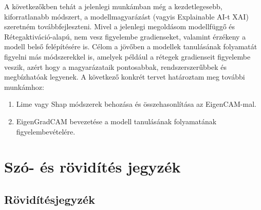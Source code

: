 \documentclass[12pt,oneside,a4paper]{article}
\newcommand{\newsection}[1]{\clearpage\section{#1}}\label{makro}
\theoremstyle{remark}
\begin{document}
	A következőkben tehát a jelenlegi munkámban még a kezdetlegesebb, kiforratlanabb módszert, a modellmagyarázást
	(vagyis Explainable AI-t
	\ac{XAI}) szeretném továbbfejleszteni.
	Mivel a jelenlegi megoldásom modellfüggő és Rétegaktiváció-alapú, nem vesz figyelembe gradienseket,
	valamint érzékeny a modell belső felépítésére is.
	Célom a jövőben a modellek tanulásának folyamatát figyelni más módszerekkel is, amelyek például a rétegek gradienseit
	figyelembe veszik, azért hogy a magyarázataik pontosabbak, rendszerszerűbbek és megbízhatóak legyenek.
	A következő konkrét tervet határoztam meg további munkámhoz:
	\begin{enumerate}
		\item Lime vagy Shap módszerek behozása és összehasonlítása az EigenCAM-mal.
		\cite{ribeiro-etal-2016-trust,lundberg2017unified}
		\item EigenGradCAM bevezetése a modell tanulásának folyamatának figyelembevételére.
	\end{enumerate}
	
	
	\printindex\label{ossz:indexjegyzek}
	
	\newsection{Szó- és rövidítés jegyzék}\label{sec:szó-es-rövidités-jegyzék}
	\printglossary\label{ossz:glossary}
	\newpage
	\subsection{Rövidítésjegyzék}\label{subsec:röviditésjegyzék}
	\begin{acronym}\label{ossz:roviditesjegyzek}
	\end{acronym}
	\newpage
	
	\label{ossz:irodalomjegyzek}
	
\end{document}
